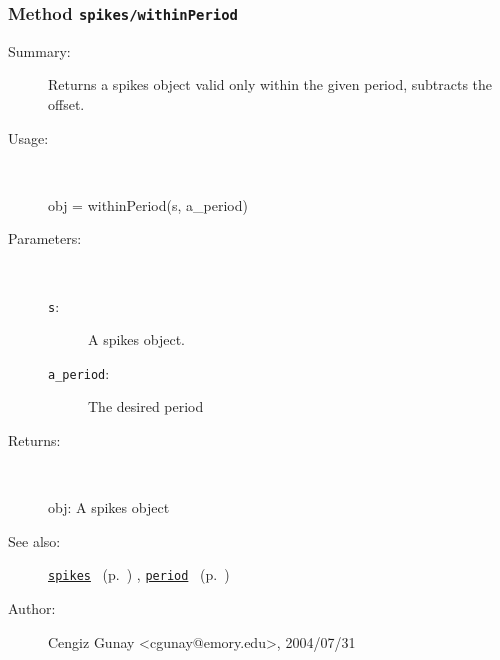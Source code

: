 \subsubsection[Method \texttt{withinPeriod}]{Method \texttt{spikes/withinPeriod}}%
%
\label{ref_spikes__withinPeriod}%
\hypertarget{ref_spikes__withinPeriod}{}%
\begin{description}
\item[Summary:]Returns a spikes object valid only within the given period, subtracts the offset.
%
\item[Usage:]~%
\begin{lyxcode}%
obj = withinPeriod(s, a\_period)
%
\end{lyxcode}%
%
%
\item[Parameters:]~
\begin{description}%
\item[\texttt{s}:]
 A spikes object.
\item[\texttt{a\_period}:]
 The desired period 
\end{description}%
%
\item[Returns:
]~

	obj: A spikes object
%
%
\item[See also:]%
\hyperlink{ref_spikes}{\texttt{spikes}}%
\ (p.~\pageref{ref_spikes})%
%
, \hyperlink{ref_period}{\texttt{period}}%
\ (p.~\pageref{ref_period})%
%
%
\item[Author:]%
Cengiz Gunay <cgunay@emory.edu>, 2004/07/31
%
\end{description}
\methodline%
